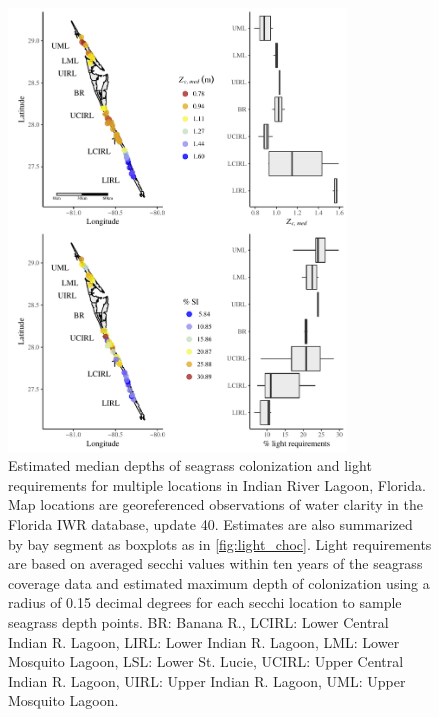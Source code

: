 \documentclass[letterpaper,12pt,oneside]{article}\usepackage[]{graphicx}\usepackage[]{color}
\begin{document}
\begin{figure}
\centering
\includegraphics[width = 0.8\textwidth]{figs/Fig9.pdf}
\caption{Estimated median depths of seagrass colonization and light requirements for multiple locations in Indian River Lagoon, Florida.  Map locations are georeferenced observations of water clarity in the Florida \acl{IWR} database, update 40.  Estimates are also summarized by bay segment as boxplots as in \cref{fig:light_choc}. Light requirements are based on averaged secchi values within ten years of the seagrass coverage data and estimated maximum depth of colonization using a radius of 0.15 decimal degrees for each secchi location to sample seagrass depth points. BR: Banana R., LCIRL: Lower Central Indian R. Lagoon, LIRL: Lower Indian R. Lagoon, LML: Lower Mosquito Lagoon, LSL: Lower St. Lucie, UCIRL: Upper Central Indian R. Lagoon, UIRL: Upper Indian R. Lagoon, UML: Upper Mosquito Lagoon.}
\label{fig:light_irl}
\end{figure}

\end{document}
